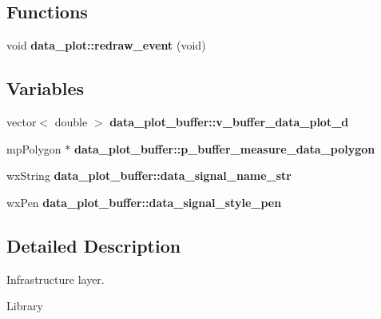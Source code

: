 \subsection*{Functions}
\begin{DoxyCompactItemize}
\item 
\mbox{\label{group___infrastructure_ga92c1e2e15fe3d720fdb4eb175d65f88f}} 
void {\bfseries data\+\_\+plot\+::redraw\+\_\+event} (void)
\end{DoxyCompactItemize}
\subsection*{Variables}
\begin{DoxyCompactItemize}
\item 
\mbox{\label{group___infrastructure_ga5009585caeeba3d07db4c9e3f0ab58dd}} 
vector$<$ double $>$ {\bfseries data\+\_\+plot\+\_\+buffer\+::v\+\_\+buffer\+\_\+data\+\_\+plot\+\_\+d}
\item 
\mbox{\label{group___infrastructure_ga404828fdbd5eee790680548e743166da}} 
mp\+Polygon $\ast$ {\bfseries data\+\_\+plot\+\_\+buffer\+::p\+\_\+buffer\+\_\+measure\+\_\+data\+\_\+polygon}
\item 
\mbox{\label{group___infrastructure_gaf1e5bf345039041a7775bf185140538e}} 
wx\+String {\bfseries data\+\_\+plot\+\_\+buffer\+::data\+\_\+signal\+\_\+name\+\_\+str}
\item 
\mbox{\label{group___infrastructure_ga1de97cef8b17b617f987eec8b411bd5f}} 
wx\+Pen {\bfseries data\+\_\+plot\+\_\+buffer\+::data\+\_\+signal\+\_\+style\+\_\+pen}
\end{DoxyCompactItemize}


\subsection{Detailed Description}
Infrastructure layer. 

Library 